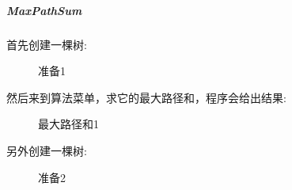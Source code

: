\documentclass[supercite]{Experimental_Report}
\theoremstyle{definition}
\begin{document}
\clearpage
\subparagraph{MaxPathSum}
\noindent
首先创建一棵树:
\begin{figure}[htbp]
	\centering
	\centering
	\caption{准备1}
	\label{fig5-74}
\end{figure}

\noindent
然后来到算法菜单，求它的最大路径和，程序会给出结果:
\begin{figure}[htbp]
	\centering
	\centering
	\caption{最大路径和1}
	\label{fig5-75}
\end{figure}

\clearpage
\noindent
另外创建一棵树:
\begin{figure}[htbp]
	\centering
	\centering
	\caption{准备2}
	\label{fig5-76}
\end{figure}
\end{document}
